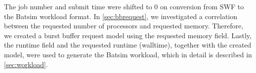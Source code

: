 \documentclass[thesis-en.tex]{subfiles}
\begin{document}
The job number and submit time were shifted to $0$ on conversion from SWF to the Batsim workload format. In \autoref{sec:bbrequest}, we investigated a correlation between the requested number of processors and requested memory. Therefore, we created a burst buffer request model using the requested memory field. Lastly, the runtime field and the requested runtime (walltime), together with the created model, were used to generate the Batsim workload, which in detail is described in \autoref{sec:workload}.
\end{document}
